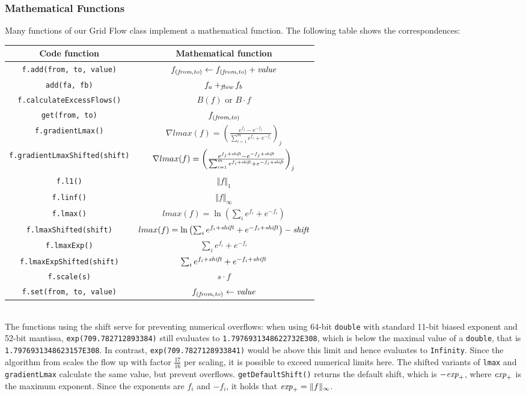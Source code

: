 \subsubsection{Mathematical Functions}
Many functions of our Grid Flow class implement a mathematical function. The following table shows the correspondences:\\
\begin{tabular}{c|c}
Code function&Mathematical function\\
\hline
\texttt{f.add(from, to, value)}&$f_{(\emph{from},\emph{to})}\gets f_{(\emph{from},\emph{to})}+\emph{value}$\\
\hline
\texttt{add(fa, fb)}&$f_a+_\emph{flow}f_b$\\
\hline
\texttt{f.calculateExcessFlows()}&$B(f)$ or $B\cdot f$\\
\hline
\texttt{get(from, to)}&$f_{(\emph{from},\emph{to})}$\\
\hline
\texttt{f.gradientLmax()}&$\nabla lmax(f)=\left(\frac{e^{f_j}-e^{-f_j}}{\sum_{i=1}^me^{f_i}+e^{-f_i}}\right)_j$\\
\hline
\texttt{f.gradientLmaxShifted(shift)}&$\nabla lmax(f)=\left(\frac{e^{f_j+\text{\emph{shift}}}-e^{-f_j+\text{\emph{shift}}}}{\sum_{i=1}^me^{f_i+\text{\emph{shift}}}+e^{-f_i+\text{\emph{shift}}}}\right)_j$\\
\hline
\texttt{f.l1()}&$\Vert f\Vert_1$\\
\hline
\texttt{f.linf()}&$\Vert f\Vert_\infty$\\
\hline
\texttt{f.lmax()}&$lmax(f)=\ln\left(\sum_ie^{f_i}+e^{-f_i}\right)$\\
\hline
\texttt{f.lmaxShifted(shift)}&$lmax(f)=\ln\left(\sum_ie^{f_i+\text{\emph{shift}}}+e^{-f_i+\text{\emph{shift}}}\right)-\text{\emph{shift}}$\\
\hline
\texttt{f.lmaxExp()}&$\sum_ie^{f_i}+e^{-f_i}$\\
\hline
\texttt{f.lmaxExpShifted(shift)}&$\sum_ie^{f_i+\text{\emph{shift}}}+e^{-f_i+\text{\emph{shift}}}$\\
\hline
\texttt{f.scale(s)}&$s\cdot f$\\
\hline
\texttt{f.set(from, to, value)}&$f_{(\emph{from},\emph{to})}\gets \emph{value}$\\
\hline
\end{tabular}\\

The functions using the shift serve for preventing numerical overflows: when using 64-bit \texttt{double} with standard 11-bit biased exponent and 52-bit mantissa, \texttt{exp(709.782712893384)} still evaluates to \texttt{1.7976931348622732E308}, which is below the maximal value of a \texttt{double}, that is \texttt{1.7976931348623157E308}. In contrast, \texttt{exp(709.7827128933841)} would be above this limit and hence evaluates to \texttt{Infinity}. Since the algorithm from \cite{nmfnlt} scales the flow up with factor $\frac{17}{16}$ per scaling, it is possible to exceed numerical limits here. The shifted variants of \texttt{lmax} and \texttt{gradientLmax} calculate the same value, but prevent overflows. \texttt{getDefaultShift()} returns the default shift, which is $-\emph{exp}_+$, where $\emph{exp}_+$ is the maximum exponent. Since the exponents are $f_i$ and $-f_i$, it holds that $\emph{exp}_+=\Vert f\Vert_\infty$.
